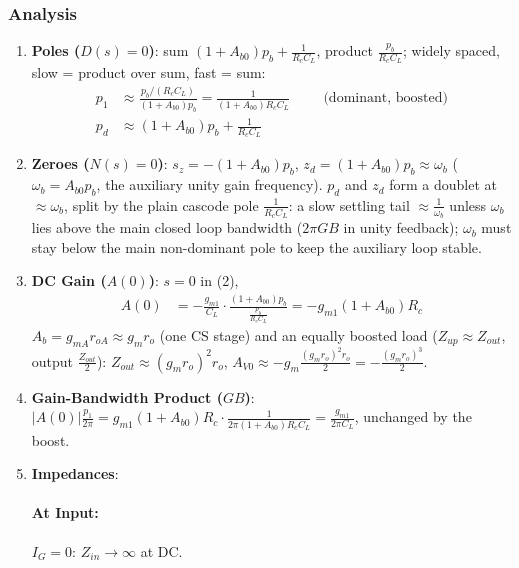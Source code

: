 \subsubsection{Analysis}
\begin{enumerate}
  \item \textbf{Poles (\(D(s) = 0\))}: sum \((1 + A_{b0}) p_b + \frac{1}{R_c C_L}\), product
    \(\frac{p_b}{R_c C_L}\); widely spaced, slow = product over sum, fast = sum:
    \begin{align*}
      p_1 &\approx \frac{p_b / (R_c C_L)}{(1 + A_{b0}) p_b} = \frac{1}{(1 + A_{b0}) R_c C_L} \hspace{1cm} \text{(dominant, boosted)} \\
      p_d &\approx (1 + A_{b0}) p_b + \frac{1}{R_c C_L}
    \end{align*}
  \item \textbf{Zeroes (\(N(s) = 0\))}: \(s_z = -(1 + A_{b0}) p_b\), \(z_d = (1 + A_{b0}) p_b \approx \omega_b\)
    (\(\omega_b = A_{b0} p_b\), the auxiliary unity gain frequency). \(p_d\) and \(z_d\) form a doublet
    at \(\approx \omega_b\), split by the plain cascode pole \(\frac{1}{R_c C_L}\): a slow settling tail
    \(\approx \frac{1}{\omega_b}\) unless \(\omega_b\) lies above the main closed loop bandwidth
    (\(2\pi GB\) in unity feedback); \(\omega_b\) must stay below the main non-dominant pole to keep
    the auxiliary loop stable.
  \item \textbf{DC Gain (\(A(0)\))}: \(s = 0\) in (2),
    \begin{align*}
      A(0) &= -\frac{g_{m1}}{C_L}\cdot\frac{(1 + A_{b0}) p_b}{\frac{p_b}{R_c C_L}} = -g_{m1} (1 + A_{b0}) R_c
    \end{align*}
    \(A_b = g_{mA} r_{oA} \approx g_m r_o\) (one CS stage) and an equally boosted load
    (\(Z_{up} \approx Z_{out}\), output \(\frac{Z_{out}}{2}\)):
    \(Z_{out} \approx (g_m r_o)^2 r_o\), \(A_{V0} \approx -g_m \frac{(g_m r_o)^2 r_o}{2} = -\frac{(g_m r_o)^3}{2}\).
  \item \textbf{Gain-Bandwidth Product (\(GB\))}: \(|A(0)| \frac{p_1}{2\pi} = g_{m1} (1 + A_{b0}) R_c \cdot \frac{1}{2\pi(1 + A_{b0}) R_c C_L} = \frac{g_{m1}}{2\pi C_L}\),
    unchanged by the boost.
  \item \textbf{Impedances}:
    \paragraph{At Input:} \(I_G = 0\): \(Z_{in} \to \infty\) at DC.

\end{enumerate}

